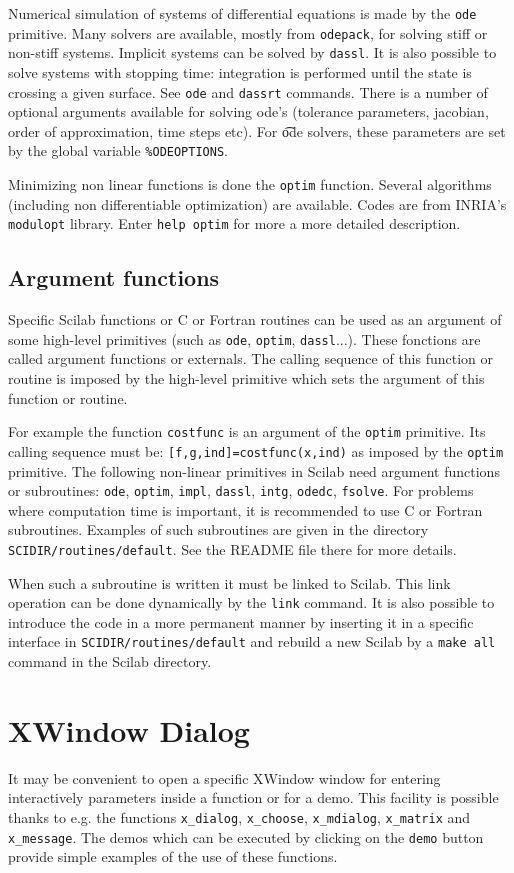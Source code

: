 Numerical simulation of systems of differential equations is
made by the {\tt ode} primitive. Many solvers are available,
mostly from {\tt odepack}, for solving stiff or non-stiff systems.
Implicit systems can be solved by {\tt dassl}. It is also
possible to solve systems with stopping time: integration
is performed until the state is crossing a given surface.
See {\tt ode} and {\tt dassrt} commands. There is a number
of optional arguments available for solving ode's (tolerance
parameters, jacobian, order of approximation, time steps etc).
For {\t ode} solvers, these parameters are set by the global 
variable {\tt \%ODEOPTIONS}.

Minimizing non linear functions is done the {\tt optim} function. 
Several algorithms (including non differentiable optimization)
are available. Codes are from INRIA's {\tt modulopt} library.
Enter {\tt help optim} for more a more detailed description.

\subsection{Argument functions}
\label{refexternals}
Specific Scilab functions or C or Fortran routines can be used as an argument
of some high-level primitives (such as {\tt ode}, {\tt optim}, {\tt dassl}...).
These fonctions are called argument functions or externals.
The calling sequence of this function or routine is imposed by
the high-level primitive which sets the argument of this function or
routine.

For example the function {\tt costfunc} is an argument of 
the {\tt optim} primitive. Its calling sequence must be: 
{\tt [f,g,ind]=costfunc(x,ind)} as imposed by the {\tt optim} primitive.
The following non-linear primitives in Scilab need argument functions
or subroutines: 
{\tt ode}, {\tt optim}, {\tt impl}, {\tt dassl}, {\tt intg}, 
{\tt odedc}, {\tt fsolve}.
For problems where computation time is important, it is recommended
to use C or Fortran subroutines. Examples of such
subroutines are given in the directory {\tt SCIDIR/routines/default}.
See the README file there for more details.

When such a subroutine is written it must be linked to Scilab.
This link operation can be done dynamically by the {\tt link}
command. It is also possible to introduce the code in a more 
permanent manner by inserting it in a specific interface in 
{\tt SCIDIR/routines/default} and rebuild a new Scilab by a 
{\tt make all} command in the Scilab directory.




\section{XWindow Dialog}
It may be convenient to open a specific XWindow window for entering
interactively parameters inside a function or for a demo.
This facility is possible thanks to e.g. the functions \verb!x_dialog!,
\verb!x_choose!, \verb!x_mdialog!, \verb!x_matrix! and \verb!x_message!.
The demos which can be executed by clicking on the {\tt demo} button
provide simple examples of the use of these functions.



